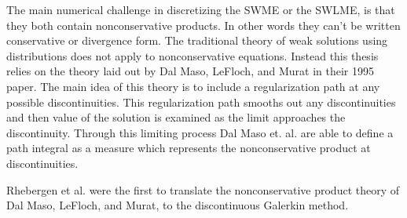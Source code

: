 The main numerical challenge in discretizing the SWME or the SWLME, is that they both
contain nonconservative products.
In other words they can't be written conservative or divergence form.
The traditional theory of weak solutions using distributions does not apply to
nonconservative equations.
Instead this thesis relies on the theory laid out by Dal Maso, LeFloch, and
Murat\cite{dal1995definition} in their 1995 paper.
The main idea of this theory is to include a regularization path at any possible
discontinuities.
This regularization path smooths out any discontinuities and then value of the solution
is examined as the limit approaches the discontinuity.
Through this limiting process Dal Maso et. al. are able to define a path integral as
a measure which represents the nonconservative product at discontinuities.

Rhebergen et al.\cite{rhebergen2008discontinuous} were the first to translate the
nonconservative product theory of Dal Maso, LeFloch, and Murat, to the discontinuous
Galerkin method.







%
%


%
%
